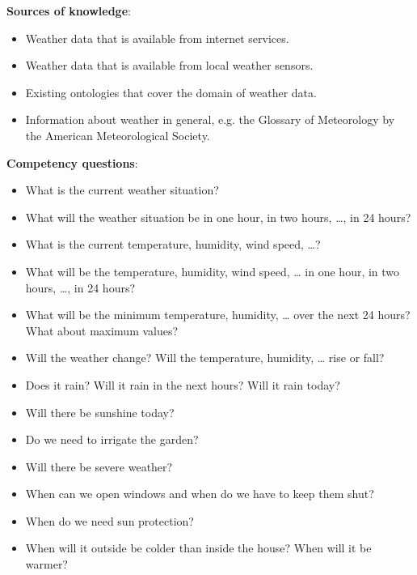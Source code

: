 \begin{mdframed}
\vspace{.2cm}

\textbf{Sources of knowledge}: %
\begin{itemize}
  \item Weather data that is available from internet services.
  \item Weather data that is available from local weather sensors.
  \item Existing ontologies that cover the domain of weather data.
  \item Information about weather in general, e.g. the Glossary of Meteorology by the American Meteorological Society. %
\end{itemize}

\textbf{Competency questions}:
\begin{itemize}
  \item What is the current weather situation?
  \item What will the weather situation be in one hour, in two hours, …, in 24 hours?
  \item What is the current temperature, humidity, wind speed, …?
  \item What will be the temperature, humidity, wind speed, … in one hour, in two hours, …, in 24 hours?
  \item What will be the minimum temperature, humidity, … over the next 24 hours? What about maximum values?
  \item Will the weather change? Will the temperature, humidity, … rise or fall?
  \item Does it rain? Will it rain in the next hours? Will it rain today?
  \item Will there be sunshine today? 
  \item Do we need to irrigate the garden?
  \item Will there be severe weather?
  \item When can we open windows and when do we have to keep them shut?
  \item When do we need sun protection?
  \item When will it outside be colder than inside the house? When will it be warmer?
\end{itemize}

\end{mdframed}

